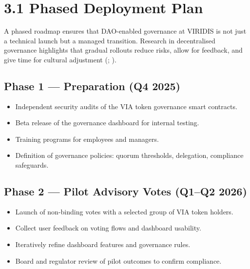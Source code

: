 \documentclass[
  english,
  12pt,
  oneside,
  open=any]{scrbook}
\providecommand{\tightlist}{%
  \setlength{\itemsep}{0pt}\setlength{\parskip}{0pt}}\usepackage{longtable,booktabs,array}
\begin{document}
\section{3.1 Phased Deployment Plan}\label{sec-phases}

A phased roadmap ensures that DAO-enabled governance at VIRIDIS is not
just a technical launch but a managed transition. Research in
decentralised governance highlights that gradual rollouts reduce risks,
allow for feedback, and give time for cultural adjustment
(;
).

\subsection{Phase 1 --- Preparation (Q4
2025)}\label{phase-1-preparation-q4-2025}

\begin{itemize}
\tightlist
\item
  Independent security audits of the VIA token governance smart
  contracts.\\
\item
  Beta release of the governance dashboard for internal testing.\\
\item
  Training programs for employees and managers.\\
\item
  Definition of governance policies: quorum thresholds, delegation,
  compliance safeguards.
\end{itemize}

\subsection{Phase 2 --- Pilot Advisory Votes (Q1--Q2
2026)}\label{phase-2-pilot-advisory-votes-q1q2-2026}

\begin{itemize}
\tightlist
\item
  Launch of non-binding votes with a selected group of VIA token
  holders.\\
\item
  Collect user feedback on voting flows and dashboard usability.\\
\item
  Iteratively refine dashboard features and governance rules.\\
\item
  Board and regulator review of pilot outcomes to confirm compliance.
\end{itemize}
\end{document}
